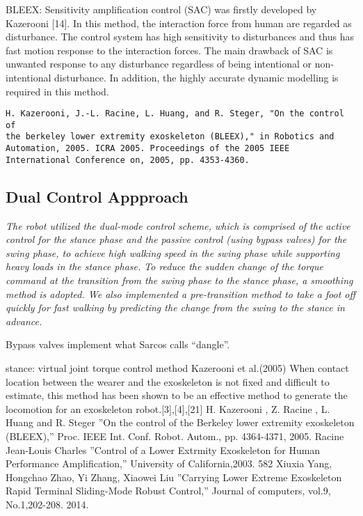 \documentclass[letterpaper,12pt,fullpage]{article}
\begin{document}
BLEEX:
Sensitivity amplification control (SAC) was firstly
developed by Kazerooni [14]. In this method, the interaction
force from human are regarded as disturbance. The control
system has high sensitivity to disturbances and thus has fast
motion response to the interaction forces. The main drawback
of SAC is unwanted response to any disturbance regardless of
being intentional or non-intentional disturbance. In addition,
the highly accurate dynamic modelling is required in this
method.
\begin{verbatim}
H. Kazerooni, J.-L. Racine, L. Huang, and R. Steger, "On the control of
the berkeley lower extremity exoskeleton (BLEEX)," in Robotics and
Automation, 2005. ICRA 2005. Proceedings of the 2005 IEEE
International Conference on, 2005, pp. 4353-4360.
\end{verbatim}

\subsection{Dual Control Appproach}

{\it The robot utilized the dual-mode control scheme, which is
comprised of the active control for the stance phase and the
passive control (using bypass valves) for the swing phase, to achieve high walking
speed in the swing phase while supporting heavy loads in
the stance phase. To reduce the sudden change of the torque
command at the transition from the swing phase to the stance
phase, a smoothing method is adopted. We also implemented
a pre-transition method to take a foot off quickly for fast
walking by predicting the change from the swing to the stance
in advance.}~\cite{IEEE07222598}

Bypass valves implement what Sarcos calls ``dangle''.

stance: virtual joint torque control method Kazerooni et al.(2005)
When contact location between the wearer and the
exoskeleton is not fixed and difficult to estimate, this method
has been shown to be an effective method to generate the
locomotion for an exoskeleton robot.[3],[4],[21]
H. Kazerooni , Z. Racine , L. Huang and R. Steger ”On the control of
the Berkeley lower extremity exoskeleton (BLEEX),” Proc. IEEE Int.
Conf. Robot. Autom., pp. 4364-4371, 2005.
Racine Jean-Louis Charles ”Control of a Lower Extrmity Exoskeleton
for Human Performance Amplification,” University of California,2003.
582
Xiuxia Yang, Hongchao Zhao, Yi Zhang, Xiaowei Liu ”Carrying
Lower Extreme Exoskeleton Rapid Terminal Sliding-Mode Robust
Control,” Journal of computers, vol.9, No.1,202-208. 2014.
\end{document}
